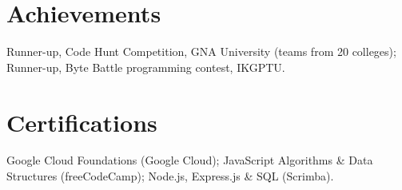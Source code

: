 \documentclass[letterpaper,11pt]{article}
\begin{document}
\section{Achievements}
 \begin{itemize}[leftmargin=0.15in, label={}]
    \small{\item{
     Runner-up, Code Hunt Competition, GNA University (teams from 20 colleges); Runner-up, Byte Battle programming contest, IKGPTU.
    }}
 \end{itemize}

\section{Certifications}
 \begin{itemize}[leftmargin=0.15in, label={}]
    \small{\item{
     Google Cloud Foundations (Google Cloud); JavaScript Algorithms \& Data Structures (freeCodeCamp); Node.js, Express.js \& SQL (Scrimba).
    }}
 \end{itemize}
\end{document}
